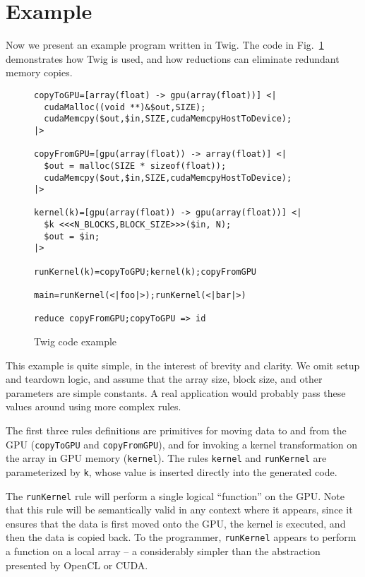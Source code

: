 
\section{Example}
\label{sec:example}

Now we present an example program written in Twig. The code in Fig.~\ref{fig:example-code} demonstrates how Twig is used, and how reductions can eliminate redundant memory copies.

\begin{figure}[ht]
\begin{verbatim}
copyToGPU=[array(float) -> gpu(array(float))] <|
  cudaMalloc((void **)&$out,SIZE);
  cudaMemcpy($out,$in,SIZE,cudaMemcpyHostToDevice);
|>

copyFromGPU=[gpu(array(float)) -> array(float)] <|
  $out = malloc(SIZE * sizeof(float));
  cudaMemcpy($out,$in,SIZE,cudaMemcpyHostToDevice);
|>

kernel(k)=[gpu(array(float)) -> gpu(array(float))] <|
  $k <<<N_BLOCKS,BLOCK_SIZE>>>($in, N);
  $out = $in;
|>

runKernel(k)=copyToGPU;kernel(k);copyFromGPU

main=runKernel(<|foo|>);runKernel(<|bar|>)

reduce copyFromGPU;copyToGPU => id
\end{verbatim}
\caption{Twig code example}
\label{fig:example-code}
\end{figure}

This example is quite simple, in the interest of brevity and clarity. We omit setup and teardown logic, and assume that the array size, block size, and other parameters are simple constants. A real application would probably pass these values around using more complex rules.

The first three rules definitions are primitives for moving data to and from the GPU (\texttt{copyToGPU} and \texttt{copyFromGPU}), and for invoking a kernel transformation on the array in GPU memory (\texttt{kernel}). The rules \texttt{kernel} and \texttt{runKernel} are parameterized by \texttt{k}, whose value is inserted directly into the generated code.

The \texttt{runKernel} rule will perform a single logical ``function'' on the GPU. Note that this rule will be semantically valid in any context where it appears, since it ensures that the data is first moved onto the GPU, the kernel is executed, and then the data is copied back. To the programmer, \texttt{runKernel} appears to perform a function on a local array -- a considerably simpler than the abstraction presented by OpenCL or CUDA.

